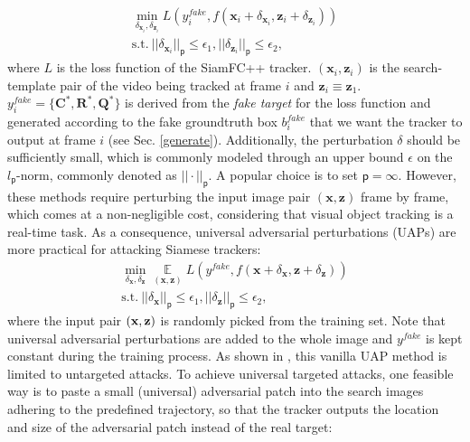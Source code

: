 \documentclass[journal]{IEEEtran}
\begin{document}
\begin{equation}
\begin{gathered}
  \min\limits_{\delta_{\textbf{x}_{i}}, \delta_{\textbf{z}_{i}}} L(y^{fake}_i, f(\textbf{x}_i + \delta_{\textbf{x}_{i}}, \textbf{z}_i + \delta_{\textbf{z}_{i}}))\\
  \text{s.t.}\ ||\delta_{\textbf{x}_i}||_{\mathsf{p}} \le \epsilon_1, ||\delta_{\textbf{z}_i}||_{\mathsf{p}} \le \epsilon_2,
\end{gathered}
\end{equation}
where $L$ is the loss function of the SiamFC++ tracker. $(\textbf{x}_i, \textbf{z}_i)$ is the search-template pair of the video being tracked at frame $i$ and $\textbf{z}_i \equiv \textbf{z}_1$. $y^{fake}_i=\{\textbf{C}^*, \textbf{R}^*, \textbf{Q}^*\}$ is derived from the \textit{fake target} for the loss function and generated according to the fake groundtruth box $b^{fake}_i$ that we want the tracker to output at frame $i$ (see Sec. \ref{generate}). 
Additionally, the perturbation $\delta$ should be sufficiently small, which is commonly modeled through an upper bound $\epsilon$ on the $l_{\mathsf{p}}\text{-norm}$, commonly denoted as $||\cdot||_{\mathsf{p}}$. A popular choice is to set ${\mathsf{p}}=\infty$.
However, these methods require perturbing the input image pair $(\textbf{x}, \textbf{z})$ frame by frame, which comes at a non-negligible cost, considering that visual object tracking is a real-time task.
As a consequence, universal adversarial perturbations (UAPs) \cite{UAP, shafahi2020universal} are more practical for attacking Siamese trackers:
\begin{equation}
  \begin{gathered}
    \min\limits_{\delta_\textbf{x}, \delta_\textbf{z}} \mathop{\mathbb{E}}\limits_{(\textbf{x}, \textbf{z})} L(y^{fake}, f(\textbf{x} + \delta_\textbf{x}, \textbf{z} + \delta_\textbf{z}))\\
    \text{s.t.}\ ||\delta_\textbf{x}||_{\mathsf{p}} \le \epsilon_1, ||\delta_\textbf{z}||_{\mathsf{p}} \le \epsilon_2,
  \end{gathered}
\end{equation}  
where the input pair $(\textbf x,\textbf z)$ is randomly picked from the training set. 
Note that universal adversarial perturbations are added to the whole image and $y^{fake}$ is kept constant during the training process.
As shown in \cite{hirano2020simple}, this vanilla UAP method is limited to untargeted attacks.
To achieve universal targeted attacks, one feasible way is to paste a small (universal) adversarial patch into the search images adhering to the predefined trajectory, so that the tracker outputs the location and size of the adversarial patch instead of the real target:
\end{document}
